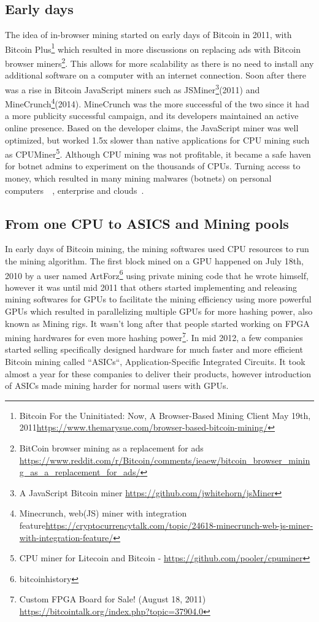 \subsection{Early days}
The idea of in-browser mining started on early days of Bitcoin in 2011, with Bitcoin Plus\footnote{Bitcoin For the Uninitiated: Now, A Browser-Based Mining Client  May 19th, 2011\url{https://www.themarysue.com/browser-based-bitcoin-mining/}} which resulted in more discussions on replacing ads with Bitcoin browser miners\footnote{BitCoin browser mining as a replacement for ads \url{https://www.reddit.com/r/Bitcoin/comments/ieaew/bitcoin_browser_mining_as_a_replacement_for_ads/}}. This allows for more scalability as there is no need to install any additional software on a computer with an internet connection. Soon after there was a rise in Bitcoin JavaScript miners such as JSMiner\footnote{A JavaScript Bitcoin miner \url{https://github.com/jwhitehorn/jsMiner}}(2011) and MineCrunch\footnote{Minecrunch, web(JS) miner with integration feature\url{https://cryptocurrencytalk.com/topic/24618-minecrunch-web-js-miner-with-integration-feature/}}(2014). MineCrunch was the more successful of the two since it had a more publicity successful campaign, and its developers maintained an active online presence. Based on the developer claims, the JavaScript miner was well optimized, but worked 1.5x slower than native applications for CPU mining such as CPUMiner\footnote{CPU miner for Litecoin and Bitcoin - \url{https://github.com/pooler/cpuminer}}. Although CPU mining was not profitable, it became a safe haven for botnet admins to experiment on the thousands of CPUs. Turning access to money, which resulted in many mining malwares (botnets) on personal computers~\cite{huang2014botcoin}~\cite{wyke2012zeroaccess}, enterprise and clouds~\cite{MiningonSOeDime2017}.

\subsection{From one CPU to ASICS and Mining pools}
In early days of Bitcoin mining, the mining softwares used CPU resources to run the mining algorithm. The first block mined on a GPU happened on July 18th, 2010 by a user named ArtForz\footnote{bitcoinhistory} using private mining code that he wrote himself, however it was until mid 2011 that others started implementing and releasing mining softwares for GPUs to facilitate the mining efficiency using more powerful GPUs which resulted in parallelizing multiple GPUs for more hashing power, also known as Mining rigs. It wasn't long after that people started working on FPGA mining hardwares for even more hashing power\footnote{Custom FPGA Board for Sale! (August 18, 2011) \url{https://bitcointalk.org/index.php?topic=37904.0}}. In mid 2012, a few companies started selling specifically designed hardware for much faster and more efficient Bitcoin mining called ``ASICs``, Application-Specific Integrated Circuits. It took almost a year for these companies to deliver their products, however introduction of ASICs made mining harder for normal users with GPUs.


